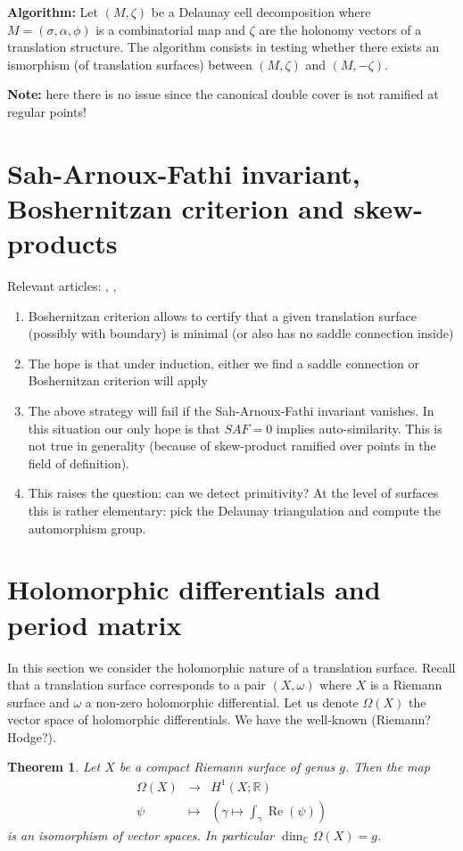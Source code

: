 \documentclass[a4paper,12pt]{article}
\def\bC{\mathbb{C}}
\def\bR{\mathbb{R}}
\def\Re{\operatorname{Re}}
\newtheorem{theorem}[definition]{Theorem}
\begin{document}
\textbf{Algorithm:} Let $(M, \zeta)$ be a Delaunay cell decomposition where $M
= (\sigma, \alpha, \phi)$ is a combinatorial map and $\zeta$ are the holonomy
vectors of a translation structure.  The algorithm consists in testing whether
there exists an ismorphism (of translation surfaces) between $(M, \zeta)$ and
$(M, -\zeta)$.

\textbf{Note:} here there is no issue since the canonical double cover is not
ramified at regular points!

\section{Sah-Arnoux-Fathi invariant, Boshernitzan criterion and skew-products}
Relevant articles: \cite{DoSchmidt}, \cite{DynnikovSkripchenko}, \cite{Boshernitzan}

\begin{enumerate}
\item Boshernitzan criterion allows to certify that a given translation surface (possibly with boundary)
is minimal (or also has no saddle connection inside)
\item The hope is that under induction, either we find a saddle connection or Boshernitzan criterion will apply
\item The above strategy will fail if the Sah-Arnoux-Fathi invariant vanishes. In this situation our only
hope is that $SAF=0$ implies auto-similarity. This is not true in generality (because of skew-product ramified
over points in the field of definition).
\item This raises the question: can we detect primitivity? At the level of
surfaces this is rather elementary: pick the Delaunay triangulation and compute
the automorphism group.
\end{enumerate}

\section{Holomorphic differentials and period matrix}
In this section we consider the holomorphic nature of a translation surface. Recall that a translation
surface corresponds to a pair $(X, \omega)$ where $X$ is a Riemann surface and $\omega$ a non-zero
holomorphic differential. Let us denote $\Omega(X)$ the vector space of holomorphic differentials.
We have the well-known (Riemann? Hodge?).
\begin{theorem}
Let $X$ be a compact Riemann surface of genus $g$. Then the map 
\[
\begin{array}{lll}
\Omega(X) & \to & H^1(X; \bR) \\
\psi & \mapsto & (\gamma \mapsto \int_\gamma \Re(\psi))
\end{array}
\]
is an isomorphism of vector spaces. In particular $\dim_\bC \Omega(X) = g$.
\end{theorem}
\end{document}

